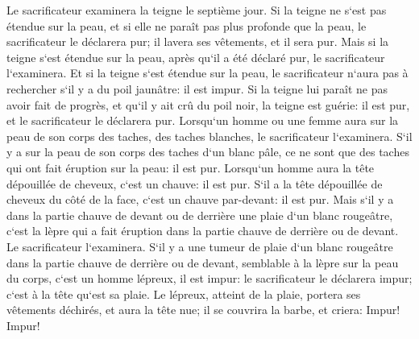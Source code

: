 \verse Le sacrificateur examinera la teigne le septième jour. Si la teigne ne s`est pas étendue sur la peau, et si elle ne paraît pas plus profonde que la peau, le sacrificateur le déclarera pur; il lavera ses vêtements, et il sera pur. 
\verse Mais si la teigne s`est étendue sur la peau, après qu`il a été déclaré pur, le sacrificateur l`examinera. 
\verse Et si la teigne s`est étendue sur la peau, le sacrificateur n`aura pas à rechercher s`il y a du poil jaunâtre: il est impur. 
\verse Si la teigne lui paraît ne pas avoir fait de progrès, et qu`il y ait crû du poil noir, la teigne est guérie: il est pur, et le sacrificateur le déclarera pur. 
\verse Lorsqu`un homme ou une femme aura sur la peau de son corps des taches, des taches blanches, 
\verse le sacrificateur l`examinera. S`il y a sur la peau de son corps des taches d`un blanc pâle, ce ne sont que des taches qui ont fait éruption sur la peau: il est pur. 
\verse Lorsqu`un homme aura la tête dépouillée de cheveux, c`est un chauve: il est pur. 
\verse S`il a la tête dépouillée de cheveux du côté de la face, c`est un chauve par-devant: il est pur. 
\verse Mais s`il y a dans la partie chauve de devant ou de derrière une plaie d`un blanc rougeâtre, c`est la lèpre qui a fait éruption dans la partie chauve de derrière ou de devant. 
\verse Le sacrificateur l`examinera. S`il y a une tumeur de plaie d`un blanc rougeâtre dans la partie chauve de derrière ou de devant, semblable à la lèpre sur la peau du corps, 
\verse c`est un homme lépreux, il est impur: le sacrificateur le déclarera impur; c`est à la tête qu`est sa plaie. 
\verse Le lépreux, atteint de la plaie, portera ses vêtements déchirés, et aura la tête nue; il se couvrira la barbe, et criera: Impur! Impur! 
